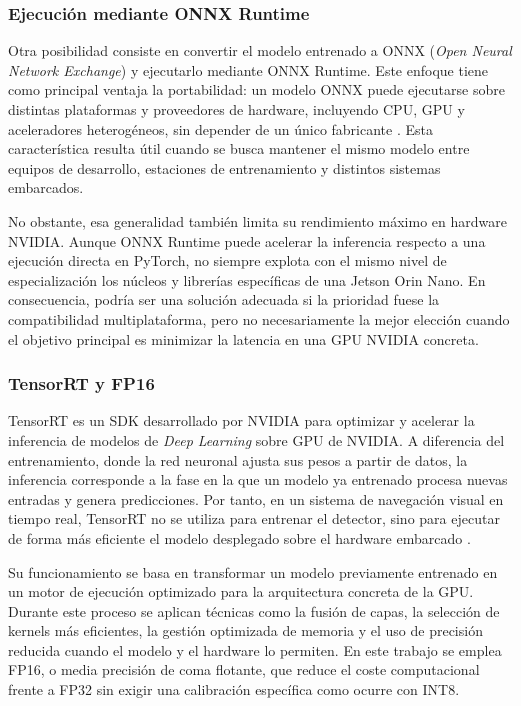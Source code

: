 \subsubsection{Ejecución mediante ONNX Runtime}

Otra posibilidad consiste en convertir el modelo entrenado a ONNX (\textit{Open Neural Network Exchange}) y ejecutarlo mediante ONNX Runtime. Este enfoque tiene como principal ventaja la portabilidad: un modelo ONNX puede ejecutarse sobre distintas plataformas y proveedores de hardware, incluyendo CPU, GPU y aceleradores heterogéneos, sin depender de un único fabricante \cite{ONNXRuntime}. Esta característica resulta útil cuando se busca mantener el mismo modelo entre equipos de desarrollo, estaciones de entrenamiento y distintos sistemas embarcados.

\vspace{0.3cm}

No obstante, esa generalidad también limita su rendimiento máximo en hardware NVIDIA. Aunque ONNX Runtime puede acelerar la inferencia respecto a una ejecución directa en PyTorch, no siempre explota con el mismo nivel de especialización los núcleos y librerías específicas de una Jetson Orin Nano. En consecuencia, podría ser una solución adecuada si la prioridad fuese la compatibilidad multiplataforma, pero no necesariamente la mejor elección cuando el objetivo principal es minimizar la latencia en una GPU NVIDIA concreta.

\vspace{0.3cm}

\subsubsection{TensorRT y FP16}

TensorRT es un SDK desarrollado por NVIDIA para optimizar y acelerar la inferencia de modelos de \textit{Deep Learning} sobre GPU de NVIDIA. A diferencia del entrenamiento, donde la red neuronal ajusta sus pesos a partir de datos, la inferencia corresponde a la fase en la que un modelo ya entrenado procesa nuevas entradas y genera predicciones. Por tanto, en un sistema de navegación visual en tiempo real, TensorRT no se utiliza para entrenar el detector, sino para ejecutar de forma más eficiente el modelo desplegado sobre el hardware embarcado \cite{NVIDIATensorRT,UltralyticsTensorRT}.

\vspace{0.3cm}

Su funcionamiento se basa en transformar un modelo previamente entrenado en un motor de ejecución optimizado para la arquitectura concreta de la GPU. Durante este proceso se aplican técnicas como la fusión de capas, la selección de kernels más eficientes, la gestión optimizada de memoria y el uso de precisión reducida cuando el modelo y el hardware lo permiten. En este trabajo se emplea FP16, o media precisión de coma flotante, que reduce el coste computacional frente a FP32 sin exigir una calibración específica como ocurre con INT8.

